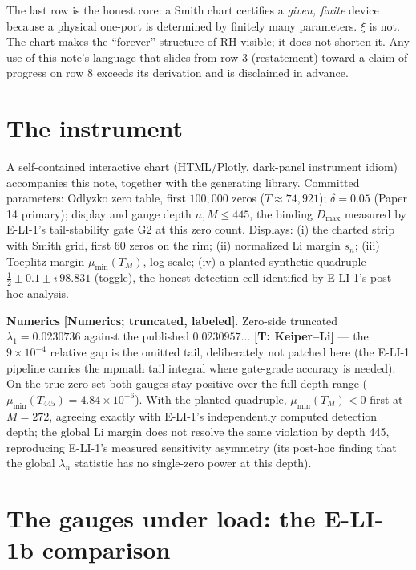 \documentclass[11pt]{article}
\theoremstyle{remark}
\newcommand{\gr}[1]{\textbf{[#1]}} %
\begin{document}
The last row is the honest core: a Smith chart certifies a \emph{given, finite} device
because a physical one-port is determined by finitely many parameters. $\xi$ is not. The
chart makes the ``forever'' structure of RH visible; it does not shorten it. Any use of this
note's language that slides from row 3 (restatement) toward a claim of progress on row 8
exceeds its derivation and is disclaimed in advance.

\section{The instrument}

A self-contained interactive chart (HTML/Plotly, dark-panel instrument idiom) accompanies
this note, together with the generating library. Committed parameters: Odlyzko zero table,
first $100{,}000$ zeros ($T\approx74{,}921$); $\delta=0.05$ (Paper 14 primary); display and
gauge depth $n,M\le445$, the binding $D_{\max}$ measured by E-LI-1's tail-stability gate G2
at this zero count. Displays: (i) the charted strip with Smith grid, first 60 zeros on the
rim; (ii) normalized Li margin $s_n$; (iii) Toeplitz margin $\mu_{\min}(T_M)$, log scale;
(iv) a planted synthetic quadruple $\tfrac12\pm0.1\pm i\,98.831$ (toggle), the honest
detection cell identified by E-LI-1's post-hoc analysis.

\textbf{Numerics} \gr{Numerics; truncated, labeled}. Zero-side truncated $\lambda_1=0.0230736$
against the published $0.0230957\ldots$ \gr{T: Keiper--Li} --- the $9\times10^{-4}$ relative
gap is the omitted tail, deliberately not patched here (the E-LI-1 pipeline carries the
mpmath tail integral where gate-grade accuracy is needed). On the true zero set both gauges
stay positive over the full depth range ($\mu_{\min}(T_{445})=4.84\times10^{-6}$). With the
planted quadruple, $\mu_{\min}(T_M)<0$ first at $M=272$, agreeing exactly with E-LI-1's
independently computed detection depth; the global Li margin does not resolve the same
violation by depth 445, reproducing E-LI-1's measured sensitivity asymmetry (its post-hoc
finding that the global $\lambda_n$ statistic has no single-zero power at this depth).

\section{The gauges under load: the E-LI-1b comparison}
\end{document}
